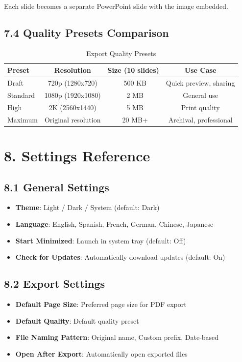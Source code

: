 \documentclass[12pt,a4paper]{article}
\newcommand{\sectionTitle}[1]{\section*{#1}}
\newcommand{\subsectionTitle}[1]{\subsection*{#1}}
\begin{document}
Each slide becomes a separate PowerPoint slide with the image embedded.

\subsectionTitle{7.4 Quality Presets Comparison}

\begin{table}[H]
    \centering
    \caption{Export Quality Presets}
    \begin{tabular}{lccc}
        \toprule
        \textbf{Preset} & \textbf{Resolution} & \textbf{Size (10 slides)} & \textbf{Use Case} \\
        \midrule
        Draft & 720p (1280x720) & ~500 KB & Quick preview, sharing \\
        Standard & 1080p (1920x1080) & ~2 MB & General use \\
        High & 2K (2560x1440) & ~5 MB & Print quality \\
        Maximum & Original resolution & ~20 MB+ & Archival, professional \\
        \bottomrule
    \end{tabular}
\end{table}

\newpage

\sectionTitle{8. Settings Reference}

\subsectionTitle{8.1 General Settings}

\begin{itemize}
    \item \textbf{Theme}: Light / Dark / System (default: Dark)
    \item \textbf{Language}: English, Spanish, French, German, Chinese, Japanese
    \item \textbf{Start Minimized}: Launch in system tray (default: Off)
    \item \textbf{Check for Updates}: Automatically download updates (default: On)
\end{itemize}

\subsectionTitle{8.2 Export Settings}

\begin{itemize}
    \item \textbf{Default Page Size}: Preferred page size for PDF export
    \item \textbf{Default Quality}: Default quality preset
    \item \textbf{File Naming Pattern}: Original name, Custom prefix, Date-based
    \item \textbf{Open After Export}: Automatically open exported files
\end{itemize}
\end{document}
